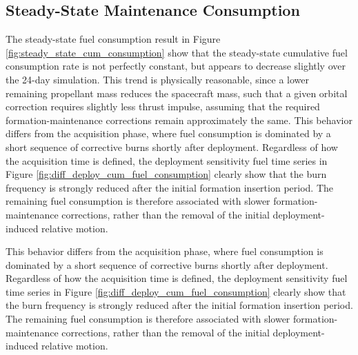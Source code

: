 \subsection{Steady-State Maintenance Consumption}
\label{sec:discussion_steady_state_fuel_consumption}

The steady-state fuel consumption result in Figure \ref{fig:steady_state_cum_consumption} show that the steady-state cumulative fuel consumption rate is not perfectly constant, but appears to decrease slightly over the 24-day simulation. This trend is physically reasonable, since a lower remaining propellant mass reduces the spacecraft mass, such that a given orbital correction requires slightly less thrust impulse, assuming that the required formation-maintenance corrections remain approximately the same. This behavior differs from the acquisition phase, where fuel consumption is dominated by a short sequence of corrective burns shortly after deployment. Regardless of how the acquisition time is defined, the deployment sensitivity fuel time series in Figure \ref{fig:diff_deploy_cum_fuel_consumption} clearly show that the burn frequency is strongly reduced after the initial formation insertion period. The remaining fuel consumption is therefore associated with slower formation-maintenance corrections, rather than the removal of the initial deployment-induced relative motion.

This behavior differs from the acquisition phase, where fuel consumption is dominated by a short sequence of corrective burns shortly after deployment. Regardless of how the acquisition time is defined, the deployment sensitivity fuel time series in Figure \ref{fig:diff_deploy_cum_fuel_consumption} clearly show that the burn frequency is strongly reduced after the initial formation insertion period. The remaining fuel consumption is therefore associated with slower formation-maintenance corrections, rather than the removal of the initial deployment-induced relative motion.

